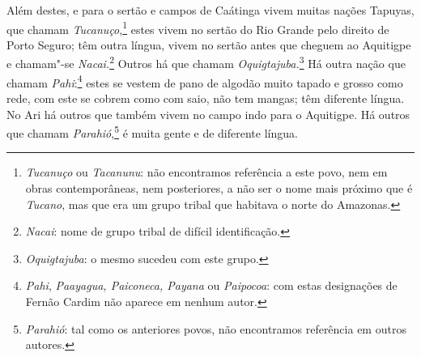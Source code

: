  Além destes, e para o sertão e campos de Caátinga vivem muitas nações
Tapuyas, que chamam \textit{Tucanuço},\footnote{ \textit{Tucanuço} ou
\textit{Tacanunu}: não encontramos referência a este povo, nem em
obras contemporâneas, nem posteriores, a não ser o nome mais próximo
que é \textit{Tucano}, mas que era um grupo tribal que habitava o norte
do Amazonas.} estes vivem no sertão do Rio Grande pelo direito
de Porto Seguro; têm outra língua, vivem no sertão antes que cheguem ao
Aquitigpe e chamam"-se \textit{Nacai.}\footnote{ \textit{Nacai}: 
nome de grupo tribal de difícil identificação.} Outros há que
chamam \textit{Oquigtajuba.}\footnote{ \textit{Oquigtajuba}: o mesmo
sucedeu com este grupo.} Há outra nação que chamam
\textit{Pahi}:\footnote{ \textit{Pahi}, \textit{Paayagua, Paiconeca,
Payana} ou \textit{Paipocoa}: com estas designações de Fernão Cardim
não aparece em nenhum autor.} estes se vestem de
pano de algodão muito tapado e grosso como rede, com este se cobrem
como com saio, não tem mangas; têm diferente língua. No Ari há outros
que também vivem no campo indo para o Aquitigpe. Há outros que chamam
\textit{Parahió},\footnote{ \textit{Parahió}: tal como os anteriores
povos, não encontramos referência em outros autores.} é muita
gente e de diferente língua. 

